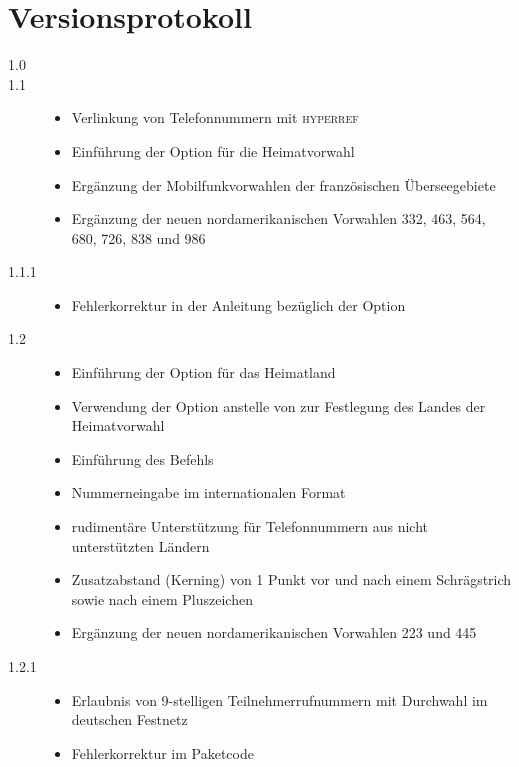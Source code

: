 \documentclass[numbers=noenddot]{scrreprt}
\newcommand*{\Paket}[1]{\textsc{#1}}
\begin{document}
\chapter{Versionsprotokoll}
\small
\begin{description}
\item[1.0] 
\item[1.1] 
\begin{itemize}
\item Verlinkung von Telefonnummern mit \Paket{hyperref}
\item Einführung der Option  für die Heimatvorwahl
\item Ergänzung der Mobilfunkvorwahlen der französischen Überseegebiete
\item Ergänzung der neuen nordamerikanischen Vorwahlen 332, 463, 564, 680, 726, 838 und 986
\end{itemize}
\item[1.1.1] 
\begin{itemize}
\item Fehlerkorrektur in der Anleitung bezüglich der Option 
\end{itemize}
\item[1.2] 
\begin{itemize}
\item Einführung der Option
für das Heimatland
\item Verwendung der Option
anstelle von
zur Festlegung des Landes der Heimatvorwahl
\item Einführung des Befehls
\item Nummerneingabe im internationalen Format
\item rudimentäre Unterstützung für Telefonnummern aus nicht unterstützten Ländern
\item Zusatzabstand (Kerning) von 1 Punkt vor und nach einem Schrägstrich sowie nach einem Pluszeichen
\item Ergänzung der neuen nordamerikanischen Vorwahlen 223 und 445
\end{itemize}
\item[1.2.1] 
\begin{itemize}
\item Erlaubnis von 9-stelligen Teilnehmerrufnummern mit Durchwahl im deutschen Festnetz
\item Fehlerkorrektur im Paketcode

\end{itemize}
\end{description}
\end{document}
